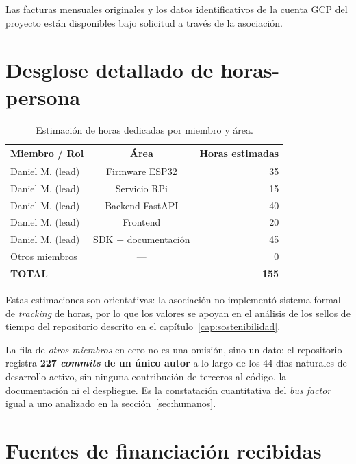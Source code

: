Las facturas mensuales originales y los datos identificativos de la
cuenta GCP del proyecto est\'an disponibles bajo solicitud a trav\'es de
la asociaci\'on.

\section{Desglose detallado de horas-persona}

\begin{table}[H]
    \centering
    \caption{Estimaci\'on de horas dedicadas por miembro y \'area.}
    \label{tab:horas_detalle}
    \begin{tabular}{lcr}
        \toprule
        \textbf{Miembro / Rol} & \textbf{\'Area} & \textbf{Horas estimadas} \\
        \midrule
        Daniel M. (lead)    & Firmware ESP32        & 35 \\
        Daniel M. (lead)    & Servicio RPi          & 15 \\
        Daniel M. (lead)    & Backend FastAPI       & 40 \\
        Daniel M. (lead)    & Frontend              & 20 \\
        Daniel M. (lead)    & SDK + documentaci\'on & 45 \\
        Otros miembros      & ---                   & 0 \\
        \midrule
        \textbf{TOTAL}      &                       & \textbf{155} \\
        \bottomrule
    \end{tabular}
\end{table}

Estas estimaciones son orientativas: la asociaci\'on no implement\'o
sistema formal de \textit{tracking} de horas, por lo que los valores se
apoyan en el an\'alisis de los sellos de tiempo del repositorio
descrito en el cap\'itulo~\ref{cap:sostenibilidad}.

La fila de \textit{otros miembros} en cero no es una omisi\'on, sino un
dato: el repositorio registra \textbf{227 \textit{commits} de un \'unico
autor} a lo largo de los 44 d\'ias naturales de desarrollo activo, sin
ninguna contribuci\'on de terceros al c\'odigo, la documentaci\'on ni el
despliegue. Es la constataci\'on cuantitativa del \textit{bus factor}
igual a uno analizado en la secci\'on~\ref{sec:humanos}.

\section{Fuentes de financiaci\'on recibidas}

